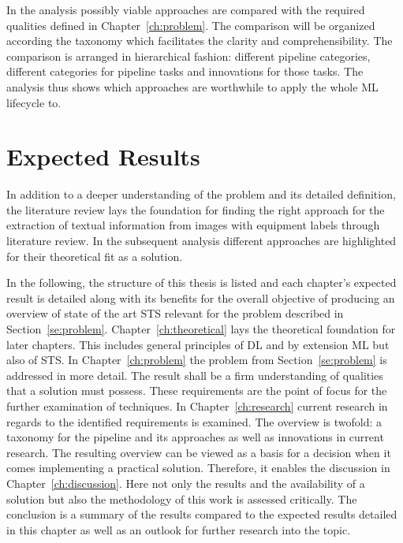 In the analysis possibly viable approaches are compared with the required qualities defined
in Chapter~\ref{ch:problem}.
The comparison will be organized according the taxonomy which facilitates the clarity and
comprehensibility.
The comparison is arranged in hierarchical fashion: different pipeline categories,
different categories for pipeline tasks and innovations for those tasks.
The analysis thus shows which approaches are worthwhile to apply the whole \ac{ML} lifecycle to.

\section{Expected Results}
In addition to a deeper understanding of the problem and its detailed definition, the literature
review lays the foundation for finding the right approach for the extraction of textual
information from images with equipment labels through literature review.
In the subsequent analysis different approaches are highlighted for their theoretical fit as a solution.

In the following, the structure of this thesis is listed and each chapter's expected
result is detailed along with its benefits for the overall objective of producing an overview of
state of the art \ac{STS} relevant for the problem described in Section~\ref{se:problem}.
Chapter~\ref{ch:theoretical} lays the theoretical foundation for later chapters.
This includes general principles of \ac{DL} and by extension \ac{ML} but also of \ac{STS}.
In Chapter~\ref{ch:problem} the problem from Section~\ref{se:problem} is addressed in more detail.
The result shall be a firm understanding of qualities that a solution must possess.
These requirements are the point of focus for the further examination of techniques.
In Chapter~\ref{ch:research} current research in regards to the
identified requirements is examined.
The overview is twofold: a taxonomy for the pipeline and its approaches as well as innovations in
current research.
The resulting overview can be viewed as a basis for a decision when it comes implementing a practical
solution.
Therefore, it enables the discussion in Chapter~\ref{ch:discussion}.
Here not only the results and the availability of a solution but also the methodology of this work
is assessed critically.
The conclusion is a summary of the results compared to the expected results detailed in this chapter
as well as an outlook for further research into the topic.
